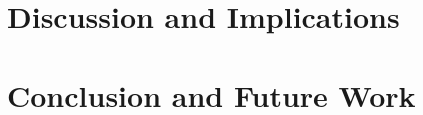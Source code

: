 \documentclass[runningheads]{llncs}
\begin{document}
\section{Discussion and Implications}

\section{Conclusion and Future Work}

%
%
%



%
%
%
%
\end{document}
